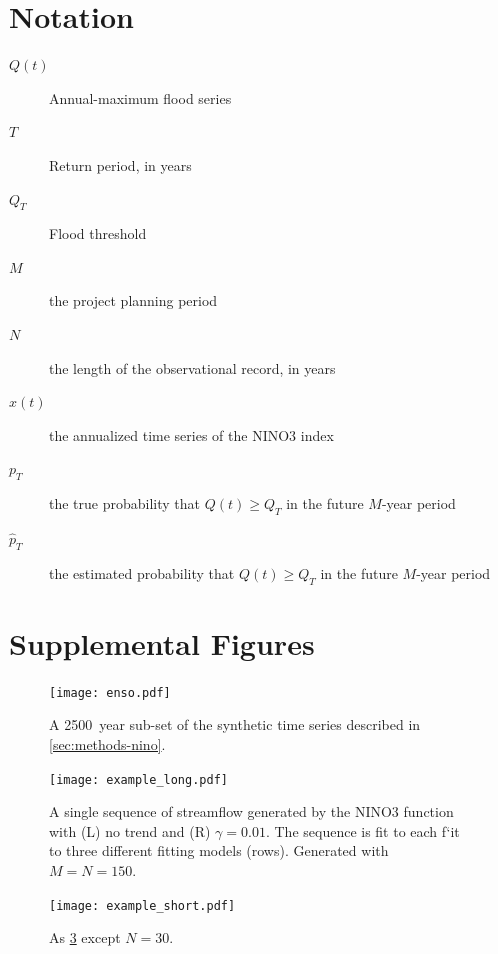\documentclass[12pt]{article}
\begin{document}
\section{Notation}

\begin{description}
  \item[\( Q(t) \)] Annual-maximum flood series
  \item[\( T \)] Return period, in years
  \item[\( Q_T \)] Flood threshold
  \item[\( M \)] the project planning period
  \item[\( N \)] the length of the observational record, in years
  \item[\( x(t) \)] the annualized time series of the NINO3 index
  \item[\( p_T \)] the true probability that \( Q(t) \geq Q_T \) in the future \(M\)-year period
  \item[\( \hat{p}_T \)] the estimated probability that \( Q(t) \geq Q_T \) in the future \(M\)-year period
\end{description}

\section{Supplemental Figures}

\begin{figure}
  \texttt{[image: enso.pdf]}
  \caption{
    A \SI{2500}{year} sub-set of the synthetic time series described in \cref{sec:methods-nino}.\label{fig:enso-ts}
  }
\end{figure}

\begin{figure}
  \texttt{[image: example\_long.pdf]}
  \caption{
    A single sequence of streamflow generated by the NINO3 function with (L) no trend and (R) \(\gamma=0.01\). 
    The sequence is fit to each f`it to three different fitting models (rows). 
    Generated with \(M=N=150\).\label{fig:example-long}
  }
\end{figure}

\begin{figure}
  \texttt{[image: example\_short.pdf]}
  \caption{
    As \cref{fig:example-short} except \(N=30\).\label{fig:example-short}
  }
\end{figure}
\end{document}
